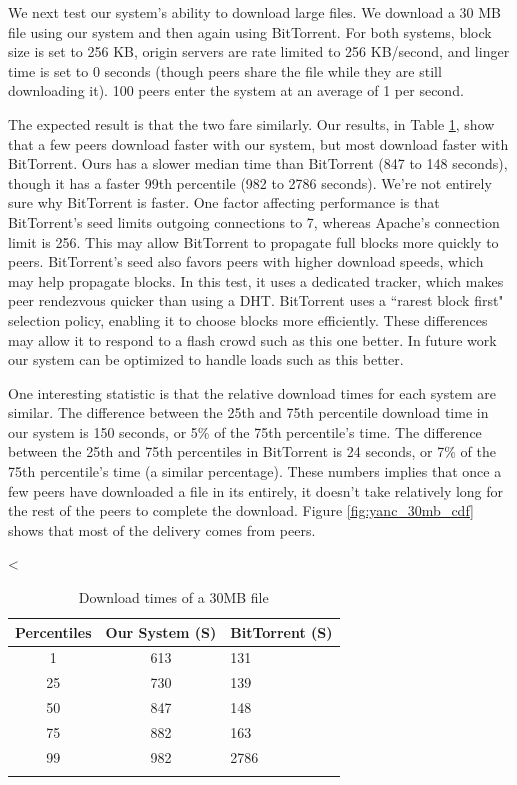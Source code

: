 We next test our system's ability to download large files. We download a 30 MB file using our system and then again using BitTorrent.
For both systems, block size is set to 256 KB, origin servers are rate limited to 256 KB/second, and linger time 
is set to 0 seconds (though peers share the file while they are still downloading it). 100 peers enter the system at an average of 1 per second.  

The expected result is that the two fare similarly.  Our results, in Table \ref{fig:yanc_vs_bt}, show that a few peers download 
faster with our system, but most download faster with BitTorrent. 
Ours has a slower median time than BitTorrent (847 to 148 seconds), though it has a faster 99th
percentile (982 to 2786 seconds). We're not entirely sure why BitTorrent is faster.  
One factor affecting performance is that BitTorrent's seed limits outgoing connections to 7, whereas Apache's connection limit is 256.
This may allow BitTorrent to propagate full blocks more quickly to peers.  BitTorrent's seed also favors peers with higher download 
speeds, which may help propagate blocks.  In this test, it uses a dedicated tracker, 
which makes peer rendezvous quicker than using a DHT.  BitTorrent uses a ``rarest block first" selection policy, 
enabling it to choose blocks more efficiently.  
These differences may allow it to respond to a flash crowd such as this one better.  
In future work our system can be optimized to handle loads such as this better.

One interesting statistic is that the relative download times for each system are similar.
The difference between the 25th and 75th percentile download time in our system is 150 seconds, 
or 5\% of the 75th percentile's time. The difference between the 25th and 75th percentiles in BitTorrent 
is 24 seconds, or 7\% of the 75th percentile's time (a similar percentage). These numbers implies that once 
a few peers have downloaded a file in its entirely, it doesn't take relatively long for the rest of the peers to complete 
the download.  Figure \ref{fig:yanc_30mb_cdf} shows that most of the delivery comes from peers.

<%
\small{
\small{
\begin{table}
  \caption{Download times of a 30MB file}
\begin{center}
\begin{tabular}{ c c l }
  Percentiles & Our System (S) & BitTorrent (S) \\
  \hline
  1 & 613 & 131 \\
  25 & 730 & 139 \\
  50 & 847 & 148 \\
  75 & 882 & 163 \\
  99 & 982 & 2786 \\
  \label{fig:yanc_vs_bt}
\end{tabular}
\end{center}
\end{table}
}
}

